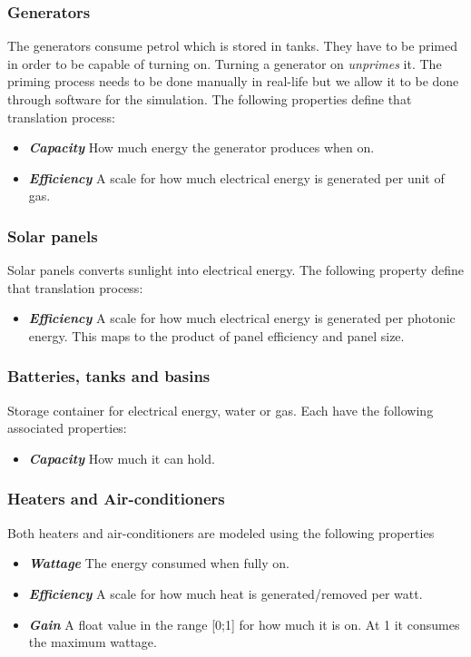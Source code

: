 \documentclass[10pt]{article}
\newcommand{\textdesc}[1]{\textit{\textbf{#1}}} %
\newcommand{\descitem}[1]{\item \textdesc{#1}}
\begin{document}
\subsubsection{Generators}

The generators consume petrol which is stored in tanks. They have to be primed in order to be capable of turning on. Turning a generator on \textsl{unprimes} it. The priming process needs to be done manually in real-life but we allow it to be done through software for the simulation. The following properties define that translation process:
\begin{itemize}
\descitem{Capacity} How much energy the generator produces when on.
\descitem{Efficiency} A scale for how much electrical energy is generated per unit of gas.
\end{itemize}

\subsubsection{Solar panels}

Solar panels converts sunlight into electrical energy. The following property define that translation process:
\begin{itemize}
\descitem{Efficiency} A scale for how much electrical energy is generated per photonic energy. This maps to the product of panel efficiency and panel size.
\end{itemize}

\subsubsection{Batteries, tanks and basins}

Storage container for electrical energy, water or gas. Each have the following associated properties:
\begin{itemize}
\descitem{Capacity} How much it can hold.
\end{itemize}

\subsubsection{Heaters and Air-conditioners}

Both heaters and air-conditioners are modeled using the following properties
\begin{itemize}
  \descitem{Wattage} The energy consumed when fully on.
  \descitem{Efficiency} A scale for how much heat is generated/removed per watt.
  \descitem{Gain} A float value in the range [0;1] for how much it is on. At 1 it consumes the maximum wattage.
\end{itemize}
\end{document}
